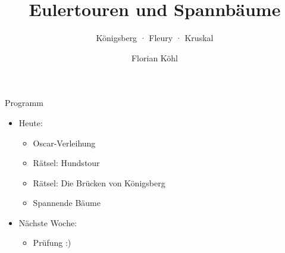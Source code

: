 \title{Eulertouren und Spannbäume}
\subtitle{Königsberg · Fleury · Kruskal}
\author{Florian Köhl}

\newcommand{\yes}{\ding{51}}
\newcommand{\no}{\ding{55}}
\newcommand{\roadnodes}[1]{%
  \node[vertex, #1] (A) at (0,-2.83) {A};   \node[vertex, #1] (B) at (1.87,-1.5) {B};
  \node[vertex, #1] (C) at (3.43,0) {C};    \node[vertex, #1] (D) at (4.53,-1.6) {D};
  \node[vertex, #1] (E) at (5.7,-3.17) {E}; \node[vertex, #1] (F) at (6.57,-1.03) {F};
  \node[vertex, #1] (G) at (8.7,0) {G};     \node[vertex, #1] (H) at (9.1,-2.17) {H};
  \node[vertex, #1] (I) at (8.4,-4.43) {I}; \node[vertex, #1] (J) at (10.47,-3.23) {J};
  \node[vertex, #1] (K) at (11.67,-0.63) {K}; \node[vertex, #1] (Z) at (12,-4.17) {Z};}
\newcommand{\koenigsberg}{%
  \fill[RoyalBlue!55!black] (0,14) .. controls (40,18) and (90,10) .. (150,16) -- (150,42) .. controls (90,36) and (40,44) .. (0,40) -- cycle;
  \fill[Tan!80!black] (45,27) ellipse (24mm and 7mm);
  \fill[Tan!80!black] (128,28) ellipse (17mm and 10mm);
  \foreach \x/\a/\b in {33/31/45, 57/31/44, 33/23/11, 57/23/12, 128/37/44, 128/19/11}
    \draw[Goldenrod, line width=2.2mm] (\x,\a) -- (\x,\b);
  \draw[Goldenrod, line width=2.2mm] (68,27) -- (112,28)}



\RTitle

\begin{frame}{Programm}
  \begin{itemize}
    \item Heute:
    \begin{itemize}
      \item Oscar-Verleihung
      \item Rätsel: Hundstour
      \item Rätsel: Die Brücken von Königsberg
      \item Spannende Bäume
    \end{itemize}
    \item Nächste Woche:
    \begin{itemize}
      \item Prüfung :)
    \end{itemize}
  \end{itemize}
\end{frame}

